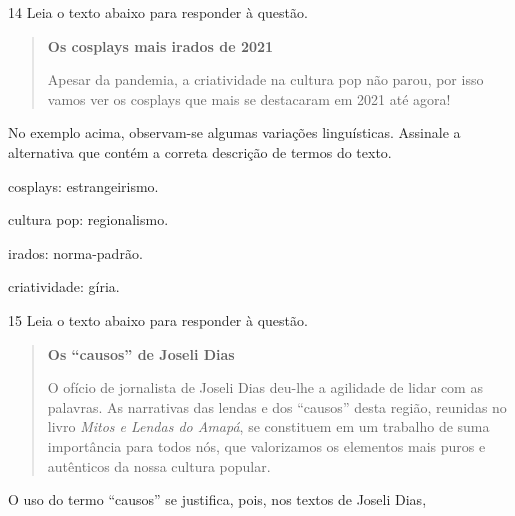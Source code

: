 \num{14} Leia o texto abaixo para responder à questão. 

\begin{quote}

\textbf{Os cosplays mais irados de 2021}

Apesar da pandemia, a criatividade na cultura pop não parou,
por isso vamos ver os cosplays que mais se destacaram em 2021 até
agora!

\end{quote}


No exemplo acima, observam-se algumas variações linguísticas. Assinale a
alternativa que contém a correta descrição de termos do texto.

\begin{escolha}
  
  \item cosplays: estrangeirismo.
  
  \item cultura pop: regionalismo.
  
  \item irados: norma-padrão.
  
  \item criatividade: gíria.

\end{escolha}

\num{15} Leia o texto abaixo para responder à questão. 

\begin{quote}

\textbf{Os ``causos'' de Joseli Dias}

O ofício de jornalista de Joseli Dias deu-lhe a agilidade de lidar com
as palavras. As narrativas das lendas e dos ``causos'' desta região,
reunidas no livro \textit{Mitos e Lendas do Amapá}, se constituem em um trabalho
de suma importância para todos nós, que valorizamos os elementos mais
puros e autênticos da nossa cultura popular.


\end{quote}

O uso do termo ``causos'' se justifica, pois, nos textos de Joseli Dias,

